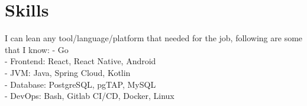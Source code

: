 \section*{Skills}
{ %
  I can lean any tool/language/platform that needed for the job,
  following are some that I know:
  \break
  \break
  - Go \\
  - Frontend: React, React Native, Android\\
  - JVM: Java, Spring Cloud, Kotlin\\
  - Database: PostgreSQL, pgTAP, MySQL\\
  - DevOps: Bash, Gitlab CI/CD, Docker, Linux
  \break
}

